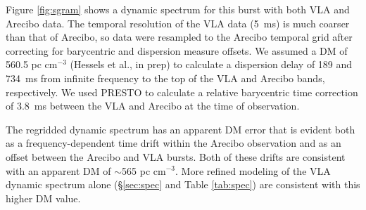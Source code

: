 \documentclass[twocolumn]{aastex61}
\begin{document}

Figure \ref{fig:sgram} shows a dynamic spectrum for this burst with both VLA and Arecibo data. The temporal resolution of the VLA data (5~ms) is much coarser than that of Arecibo, so data were resampled to the Arecibo temporal grid after correcting for barycentric and dispersion measure offsets. We assumed a DM of 560.5 pc cm$^{-3}$ (Hessels et al., in prep) to calculate a dispersion delay of 189 and 734~ms from infinite frequency to the top of the VLA and Arecibo bands, respectively. We used PRESTO \citep{2001PhDT.......123R} to calculate a relative barycentric time correction of 3.8~ms between the VLA and Arecibo at the time of observation.

The regridded dynamic spectrum has an apparent DM error that is evident both as a frequency-dependent time drift within the Arecibo observation and as an offset between the Arecibo and VLA bursts. Both of these drifts are consistent with an apparent DM of $\sim$565 pc cm$^{-3}$. More refined modeling of the VLA dynamic spectrum alone (\S \ref{sec:spec} and Table \ref{tab:spec}) are consistent with this higher DM value.
\end{document}
